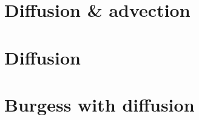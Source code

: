 \documentclass{book}
\numberwithin{equation}{section}
\numberwithin{table}{section}
\begin{document}
\tableofcontents

\newpage
\section{Diffusion \& advection}

\newpage

\newpage

\newpage


\newpage
\section{Diffusion}
%
%


\newpage
\section{Burgess with diffusion}
%
%



	
\end{document}
